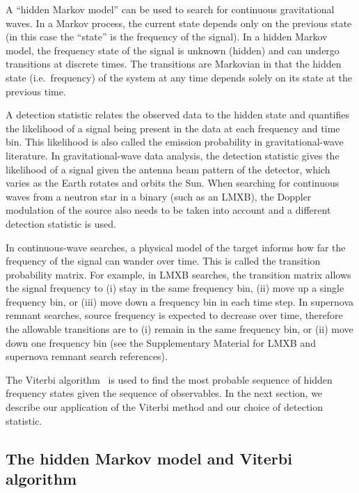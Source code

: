 \documentclass[paper-main.tex]{subfiles}
\begin{document}
A ``hidden Markov model'' can be used to search for continuous gravitational waves.\cite{SuvorovaEtAl:2017} 
In a Markov process, the current state depends only on the previous state (in this case the ``state'' is the frequency of the signal). 
In a hidden Markov model, the frequency state of the signal is unknown (hidden) and can undergo transitions at discrete times. 
The transitions are Markovian in that the hidden state (i.e.\ frequency) of the system at any time depends solely on its state at the previous time. 


A detection statistic relates the observed data to the hidden state and quantifies the likelihood of a signal being present in the data at each frequency and time bin.
This likelihood is also called the emission probability in gravitational-wave literature.  
In gravitational-wave data analysis, the detection statistic gives the likelihood of a signal given the antenna beam pattern of the detector, which varies as the Earth rotates and orbits the Sun.\cite{JKS:1998}
When searching for continuous waves from a neutron star in a binary (such as an LMXB), the Doppler modulation of the source also needs to be taken into account and a different detection statistic is used.\cite{SuvorovaEtAl:2017}


In continuous-wave searches, a physical model of the target informs how far the frequency of the signal can wander over time. 
This is called the transition probability matrix. 
For example, in LMXB searches, the transition matrix allows the signal frequency to (i) stay in the same frequency bin, (ii) move up a single frequency bin, or (iii) move down a frequency bin in each time step.\cite{ScoX1O2Viterbi:2019}
In supernova remnant searches, source frequency is expected to decrease over time, therefore the allowable transitions are to (i) remain in the same frequency bin, or (ii) move down one frequency bin (see the Supplementary Material for LMXB and supernova remnant search references). 


The Viterbi algorithm~\cite{Viterbi:1967} is used to find the most probable sequence of hidden frequency states given the sequence of observables.
In the next section, we describe our application of the Viterbi method and our choice of detection statistic. 


\subsection{The hidden Markov model and Viterbi algorithm}
\label{sec:viterbi}
\end{document}
